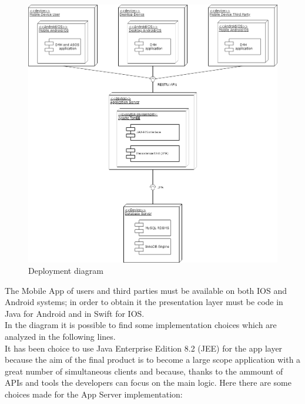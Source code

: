 \begin{figure}[h!]
	\includegraphics[width=1.0\textwidth]{./pictures/deployment_diagram.png}\par
	\caption{Deployment diagram}
\end{figure}
\FloatBarrier The Mobile App of users and third parties must be available on both IOS and Android systems; in order to obtain it the presentation layer must be code in Java for Android and in Swift for IOS.\\
In the diagram it is possible to find some implementation choices which are analyzed in the following lines.\\
It has been choice to use Java Enterprise Edition 8.2 (JEE) for the app layer because the aim of the final product is to become a large scope application with a great number of simultaneous clients and because, thanks to the ammount of APIs and tools the developers can focus on the main logic.
Here there are some choices made for the App Server implementation:
